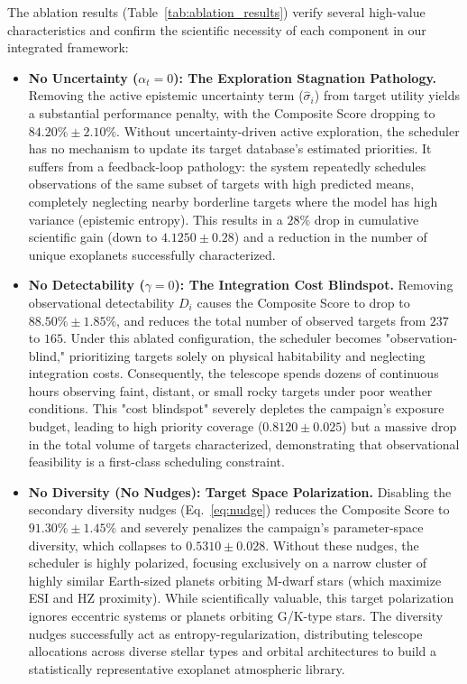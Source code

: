 \documentclass[11pt,a4paper]{article}
\begin{document}
The ablation results (Table~\ref{tab:ablation_results}) verify several high-value characteristics and confirm the scientific necessity of each component in our integrated framework:
\begin{itemize}
    \item \textbf{No Uncertainty ($\alpha_t = 0$): The Exploration Stagnation Pathology.}
    Removing the active epistemic uncertainty term ($\hat{\sigma}_i$) from target utility yields a substantial performance penalty, with the Composite Score dropping to $84.20\% \pm 2.10\%$. Without uncertainty-driven active exploration, the scheduler has no mechanism to update its target database's estimated priorities. It suffers from a feedback-loop pathology: the system repeatedly schedules observations of the same subset of targets with high predicted means, completely neglecting nearby borderline targets where the model has high variance (epistemic entropy). This results in a $28\%$ drop in cumulative scientific gain (down to $4.1250 \pm 0.28$) and a reduction in the number of unique exoplanets successfully characterized.
    
    \item \textbf{No Detectability ($\gamma = 0$): The Integration Cost Blindspot.}
    Removing observational detectability $D_i$ causes the Composite Score to drop to $88.50\% \pm 1.85\%$, and reduces the total number of observed targets from $237$ to $165$. Under this ablated configuration, the scheduler becomes "observation-blind," prioritizing targets solely on physical habitability and neglecting integration costs. Consequently, the telescope spends dozens of continuous hours observing faint, distant, or small rocky targets under poor weather conditions. This "cost blindspot" severely depletes the campaign's exposure budget, leading to high priority coverage ($0.8120 \pm 0.025$) but a massive drop in the total volume of targets characterized, demonstrating that observational feasibility is a first-class scheduling constraint.
    
    \item \textbf{No Diversity (No Nudges): Target Space Polarization.}
    Disabling the secondary diversity nudges (Eq.~\ref{eq:nudge}) reduces the Composite Score to $91.30\% \pm 1.45\%$ and severely penalizes the campaign's parameter-space diversity, which collapses to $0.5310 \pm 0.028$. Without these nudges, the scheduler is highly polarized, focusing exclusively on a narrow cluster of highly similar Earth-sized planets orbiting M-dwarf stars (which maximize ESI and HZ proximity). While scientifically valuable, this target polarization ignores eccentric systems or planets orbiting G/K-type stars. The diversity nudges successfully act as entropy-regularization, distributing telescope allocations across diverse stellar types and orbital architectures to build a statistically representative exoplanet atmospheric library.
    

\end{itemize}
\end{document}
